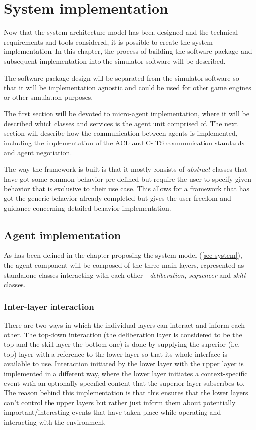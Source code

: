 \documentclass[main.tex]{subfiles}
\begin{document}
\section{System implementation}

Now that the system architecture model has been designed and the technical requirements and
tools considered, it is possible to create the system implementation. In this chapter, the
process of building the software package and subsequent implementation into the simulator
software will be described. 

The software package design will be separated from the simulator software so that it will be 
implementation agnostic and could be used for other game engines or other simulation purposes. 

The first section will be devoted to micro-agent implementation, where it will be described which 
classes and services is the agent unit comprised of. The next section will describe how the 
communication between agents is implemented, including the implementation of the ACL and C-ITS communication 
standards and agent negotiation. 

The way the framework is built is that it mostly consists of \emph{abstract} classes that have got some 
common behavior pre-defined but require the user to specify given behavior that is exclusive to their 
use case. This allows for a framework that has got the generic behavior already completed but 
gives the user freedom and guidance concerning detailed behavior implementation. 

\subsection{Agent implementation}

As has been defined in the chapter proposing the system model (\ref{sec-system}), the agent component 
will be composed of the three main layers, represented as standalone classes interacting with 
each other - \emph{deliberation}, \emph{sequencer} and \emph{skill} classes.

\subsubsection{Inter-layer interaction}

There are two ways in which the individual layers can interact and inform each other. The top-down 
interaction (the deliberation layer is considered to be the top and the skill layer the bottom one) 
is done by supplying the superior (i.e. top) layer with a reference to the lower layer so that 
its whole interface is available to use. Interaction initiated by the lower layer with the upper layer 
is implemented in a different way, where the lower layer initiates a context-specific event with an 
optionally-specified content that the superior layer subscribes to. The reason behind this implementation
is that this ensures that the lower layers can't control the upper layers but rather just inform them about 
potentially important/interesting events that have taken place while operating and interacting with 
the environment.
\end{document}
